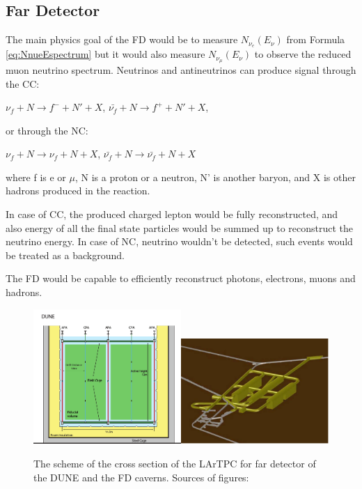\subsection{Far Detector}

The main physics goal of the FD would be to measure $N_{\nu_e}(E_{\nu})$  from Formula \ref{eq:NnueEspectrum} but it would also measure $N_{\nu_\mu}(E_{\nu})$ to observe the reduced muon neutrino spectrum. Neutrinos and antineutrinos can produce signal through the CC:

$\nu_f+N \rightarrow f^- + N' +X$, $\bar{\nu_f}+N \rightarrow f^+ + N' +X$,

or through the NC:

$\nu_f+N \rightarrow \nu_f + N +X$, $\bar{\nu_f}+N \rightarrow \bar{\nu_f} + N +X$

where f is e or $\mu$, N is a proton or a neutron, N' is another baryon, and X is other hadrons produced in the reaction.

In case of CC, the produced charged lepton would be fully reconstructed, and also energy of all the final state particles would be summed up to reconstruct the neutrino energy. In case of NC, neutrino wouldn't be detected, such events would be treated as a background.

The FD would be capable to efficiently reconstruct photons, electrons, muons and hadrons. \\

\begin{figure}
\caption{The scheme of the cross section of the LArTPC for far detector of the DUNE and the FD caverns. Sources of figures: \cite{ref_LBNF_CDR}}
\label{fig:farDetector_TPC}
\centering
\includegraphics[width=0.5\textwidth, keepaspectratio=true]{figs/farDetector_TPC.png}\includegraphics[width=0.5\textwidth, keepaspectratio=true]{figs/farDetector_Caverns.png}
\end{figure}

